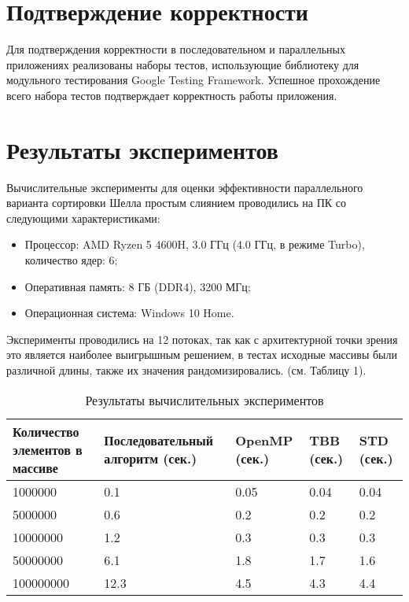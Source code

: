 \documentclass{report}
\begin{document}
\newpage

\section*{Подтверждение корректности}
Для подтверждения корректности в последовательном и параллельных приложениях реализованы наборы тестов, использующие библиотеку для модульного тестирования Google Testing Framework. Успешное прохождение всего набора тестов подтверждает корректность работы приложения.

\newpage

\section*{Результаты экспериментов}
Вычислительные эксперименты для оценки эффективности параллельного варианта
сортировки Шелла простым слиянием проводились на ПК со следующими характеристиками:
\begin{itemize}
\item Процессор: AMD Ryzen 5 4600H, 3.0 ГГц (4.0 ГГц, в режиме Turbo), количество ядер: 6;
\item Оперативная память: 8 ГБ (DDR4), 3200 МГц;
\item Операционная система: Windows 10 Home.
\end{itemize}

\par Эксперименты проводились на 12 потоках, так как с архитектурной точки зрения это является наиболее выигрышным решением, в тестах исходные массивы были различной длины, также их значения рандомизировались. (см. Таблицу 1).

\begin{table}[!h]
\caption{Результаты вычислительных экспериментов}
\centering
\begin{tabular}{| p{4cm} | p{4cm} | p{2cm} | p{2cm} | p{2cm} |}
\hline
Количество элементов в массиве & Последовательный алгоритм (сек.) & OpenMP (сек.) & TBB (сек.) & STD (сек.) \\[5pt]
\hline
1000000        & 0.1         & 0.05     & 0.04       & 0.04     \\
5000000        & 0.6         & 0.2      & 0.2        & 0.2     \\
10000000       & 1.2         & 0.3      & 0.3        & 0.3     \\
50000000       & 6.1         & 1.8      & 1.7        & 1.6     \\
100000000      & 12.3        & 4.5      & 4.3        & 4.4     \\
\hline
\end{tabular}
\end{table}
\end{document}
